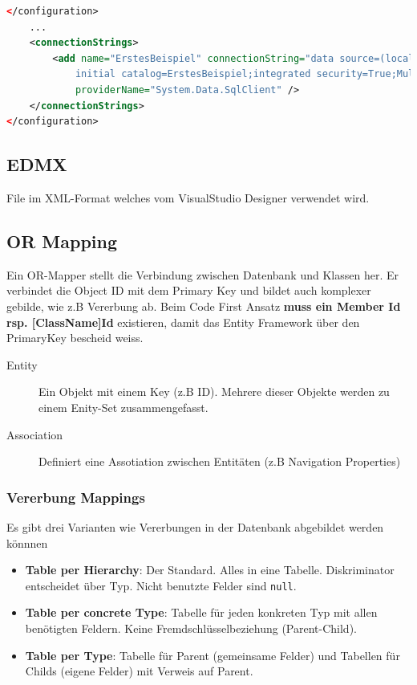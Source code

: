 \documentclass[
a4paper,
oneside,
10pt,
fleqn,
headsepline,
toc=listofnumbered, 
bibliography=totocnumbered]{scrartcl}
\begin{document}
\begin{lstlisting}[language=XML, caption=app.config]
</configuration>
	...
	<connectionStrings>
		<add name="ErstesBeispiel" connectionString="data source=(localdb)\mssqllocaldb;
			initial catalog=ErstesBeispiel;integrated security=True;MultipleActiveResultSets=True;App=EntityFramework"
			providerName="System.Data.SqlClient" />
	</connectionStrings>
</configuration>
\end{lstlisting}

\subsection{EDMX}

File im XML-Format welches vom VisualStudio Designer verwendet wird.

\subsection{OR Mapping}
Ein OR-Mapper stellt die Verbindung zwischen Datenbank und Klassen her. Er verbindet die Object ID mit dem Primary Key und bildet auch komplexer gebilde, wie z.B Vererbung ab. Beim Code First Ansatz \textbf{muss ein Member Id rsp. [ClassName]Id} existieren, damit das Entity Framework über den PrimaryKey bescheid weiss.
\begin{description}
	\item[Entity] Ein Objekt mit einem Key (z.B ID). Mehrere dieser Objekte werden zu einem Enity-Set zusammengefasst.
	\item[Association] Definiert eine Assotiation zwischen Entitäten (z.B Navigation Properties)
\end{description}

\subsubsection{Vererbung Mappings}
Es gibt drei Varianten wie Vererbungen in der Datenbank abgebildet werden könnnen
\begin{itemize}
	\item \textbf{Table per Hierarchy}: Der Standard. Alles in eine Tabelle. Diskriminator entscheidet über Typ. Nicht benutzte Felder sind \lstinline|null|. 
	\item \textbf{Table per concrete Type}: Tabelle für jeden konkreten Typ mit allen benötigten Feldern. Keine Fremdschlüsselbeziehung (Parent-Child).
	\item \textbf{Table per Type}: Tabelle für Parent (gemeinsame Felder) und Tabellen für Childs (eigene Felder) mit Verweis auf Parent.
\end{itemize}
\end{document}
